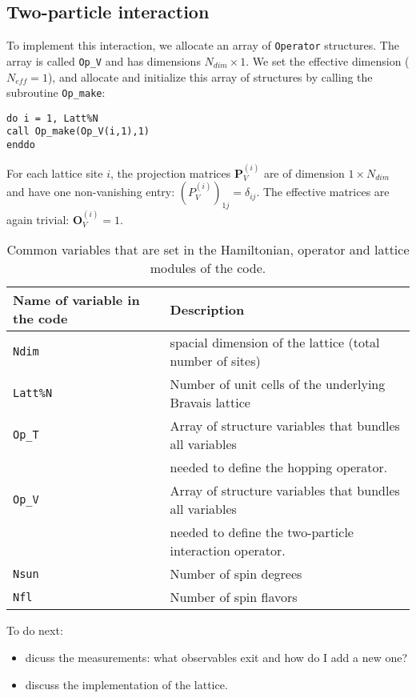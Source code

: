 \subsection{Two-particle interaction}
To implement this interaction, we allocate an array of \texttt{Operator} structures. The array is called  \texttt{Op\_V} and has dimensions $N_{dim}\times 1$. 
We set the effective dimension ($N_{eff}=1$), and allocate and initialize this array of structures by calling the subroutine \texttt{Op\_make}: 
\begin{verbatim}
do i = 1, Latt%N
call Op_make(Op_V(i,1),1)
enddo
\end{verbatim}
For each lattice site $i$, the projection matrices ${\bm P}_{V}^{(i)}$ are of dimension $1\times N_{dim} $ and have one non-vanishing entry: $(P_{V}^{(i)})_{1j}=\delta_{ij}$. 
The effective matrices are again trivial: ${\bm O}_{V}^{(i)}=1$.\\


\begin{table}[h]
   \begin{tabular}{l l}
    Name of variable in the code & Description \\\hline
    \texttt{Ndim}    & spacial dimension of the lattice (total number of sites) \\
    \texttt{Latt\%N} & Number of unit cells of the underlying Bravais lattice  \\
    \texttt{Op\_T}   & Array of structure variables that bundles all variables\\
                     & needed to define the hopping operator.\\
    \texttt{Op\_V}   & Array of structure variables that bundles all variables\\
                     & needed to define the two-particle interaction operator.\\ 
    \texttt{Nsun}    & Number of spin degrees\\
    \texttt{Nfl}      & Number of spin flavors\\
   \end{tabular}
   \caption{Common variables that are set in the Hamiltonian, operator and lattice modules of the code.
   \label{tab:definitions}}
\end{table}



To do next:
\begin{itemize}
\item dicuss the measurements: what observables exit and how do I add a new one?
\item  discuss the implementation of the lattice.
\end{itemize}

